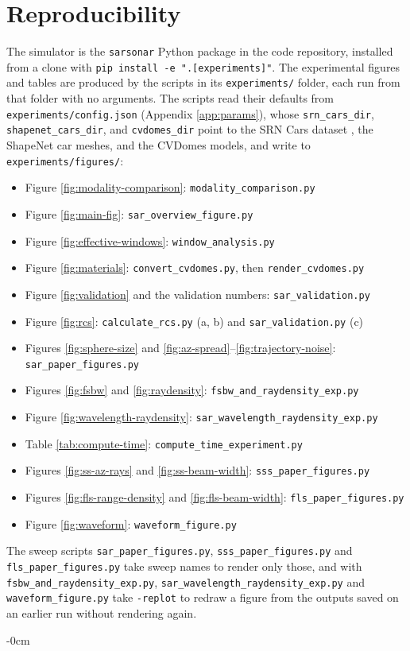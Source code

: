 \documentclass[sensors,article,submit,moreauthors]{Definitions/mdpi}
\begin{document}
\section{Reproducibility}
\label{app:repro}
The simulator is the \texttt{sarsonar} Python package in the code repository,
installed from a clone with \texttt{pip install -e ".[experiments]"}.
The experimental figures and tables are produced by the scripts in its
\texttt{experiments/} folder, each run from that folder with no arguments.
The scripts read their defaults from \texttt{experiments/config.json} (Appendix
\ref{app:params}), whose \texttt{srn\_cars\_dir}, \texttt{shapenet\_cars\_dir},
and \texttt{cvdomes\_dir} point to the SRN Cars dataset \cite{srn}, the ShapeNet
\cite{shapenet} car meshes, and the CVDomes \cite{cvdomes} models, and write to
\texttt{experiments/figures/}:
\begin{itemize}
  \item Figure \ref{fig:modality-comparison}: \texttt{modality\_comparison.py}
  \item Figure \ref{fig:main-fig}: \texttt{sar\_overview\_figure.py}
  \item Figure \ref{fig:effective-windows}: \texttt{window\_analysis.py}
  \item Figure \ref{fig:materials}: \texttt{convert\_cvdomes.py}, then
  \texttt{render\_cvdomes.py}
  \item Figure \ref{fig:validation} and the validation numbers:
  \texttt{sar\_validation.py}
  \item Figure \ref{fig:rcs}: \texttt{calculate\_rcs.py} (a, b) and
  \texttt{sar\_validation.py} (c)
  \item Figures \ref{fig:sphere-size} and
  \ref{fig:az-spread}--\ref{fig:trajectory-noise}:
  \texttt{sar\_paper\_figures.py}
  \item Figures \ref{fig:fsbw} and \ref{fig:raydensity}:
  \texttt{fsbw\_and\_raydensity\_exp.py}
  \item Figure \ref{fig:wavelength-raydensity}:
  \texttt{sar\_wavelength\_raydensity\_exp.py}
  \item Table \ref{tab:compute-time}: \texttt{compute\_time\_experiment.py}
  \item Figures \ref{fig:ss-az-rays} and \ref{fig:ss-beam-width}:
  \texttt{sss\_paper\_figures.py}
  \item Figures \ref{fig:fls-range-density} and \ref{fig:fls-beam-width}:
  \texttt{fls\_paper\_figures.py}
  \item Figure \ref{fig:waveform}: \texttt{waveform\_figure.py}
\end{itemize}
\begin{sloppypar}
The sweep scripts \texttt{sar\_paper\_figures.py},
\texttt{sss\_paper\_figures.py} and \texttt{fls\_paper\_figures.py} take sweep
names to render only those, and with \texttt{fsbw\_and\_raydensity\_exp.py},
\texttt{sar\_wavelength\_raydensity\_exp.py} and \texttt{waveform\_figure.py}
take \texttt{-replot} to redraw a figure from the outputs saved on an earlier
run without rendering again.
\end{sloppypar}

\begin{adjustwidth}{-\extralength}{0cm}



\PublishersNote{}
\end{adjustwidth}
\end{document}
